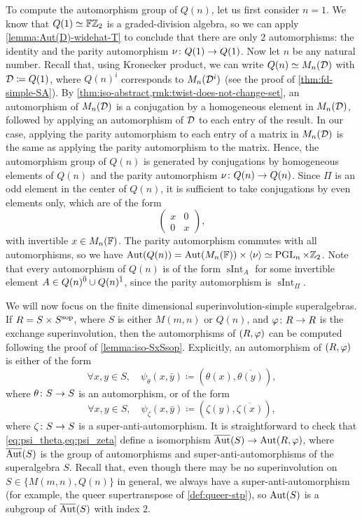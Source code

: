 To compute the automorphism group of $Q(n)$, let us first consider $n = 1$. 
We know that $Q(1) \simeq \mathbb{F}\mathbb{Z}_2$ is a graded-division algebra, so we can apply \cref{lemma:Aut(D)-widehat-T} to conclude that there are only $2$ automorphisms: the identity and the parity automorphism $\nu\colon Q(1) \to Q(1)$. 
Now let $n$ be any natural number. 
Recall that, using Kronecker product, we can write $Q(n) \simeq M_n(\mathcal{D})$ with $\mathcal{D} \coloneqq Q(1)$, where $Q(n)^i$ corresponds to $M_n(\mathcal{D}^i)$ (see the proof of \cref{thm:fd-simple-SA}). 
By \cref{thm:iso-abstract,rmk:twist-does-not-change-set}, an automorphism of $M_n(\mathcal{D})$ is a conjugation by a homogeneous element in $M_n(\mathcal{D})$, followed by applying an automorphism of $\mathcal{D}$ to each entry of the result. 
In our case, applying the parity automorphism to each entry of a matrix in $M_n(\mathcal{D})$ is the same as applying the parity automorphism to the matrix. 
Hence, the automorphism group of $Q(n)$ is generated by conjugations by homogeneous elements of $Q(n)$ and the parity automorphism $\nu\colon Q(n) \to Q(n)$. 
Since $\Pi$ is an odd element in the center of $Q(n)$, it is sufficient to take conjugations by even elements only, which are of the form
\[
\begin{pmatrix}
    x & 0\\
    0 & x
\end{pmatrix},
\]
with invertible $x \in M_{n}(\mathbb{F})$. 
The parity automorphism commutes with all automorphisms, so we have $\operatorname{Aut}(Q(n)) = \operatorname{Aut}(M_n(\mathbb{F})) \times \langle \nu \rangle \simeq \operatorname{PGL}_n \times \mathbb{Z}_2$. 
Note that every automorphism of $Q(n)$ is of the form $\operatorname{sInt}_A$ for some invertible element $A \in Q(n)^{\bar0} \cup Q(n)^{\bar1}$, since the parity automorphism is $\operatorname{sInt}_\Pi$. 

We will now focus on the finite dimensional superinvolution-simple superalgebras. 
If $R = S\times S^{\mathrm{sop}}$, where $S$ is either $M(m,n)$ or $Q(n)$, and $\varphi\colon R \to R$ is the exchange superinvolution, then the automorphisms of $(R, \varphi)$ can be computed following the proof of \cref{lemma:iso-SxSsop}. 
Explicitly, an automorphism of $(R, \varphi)$ is either of the form
\[\label{eq:psi_theta}
    \forall x,y \in S, \quad \psi_\theta (x, \bar {y}) \coloneqq (\theta(x), \overline{\theta(y)}),
\]
where $\theta\colon S \to S$ is an automorphism, or of the form
\[\label{eq:psi_zeta}
    \forall x,y \in S, \quad \psi_\zeta (x, \bar {y}) \coloneqq (\zeta(y), \overline{\zeta(x)}),
\]
where $\zeta\colon S \to S$ is a super-anti-automorphism. 
It is straightforward to check that \cref{eq:psi_theta,eq:psi_zeta} define a isomorphism $\overline{\operatorname{Aut}}(S) \to \operatorname{Aut}(R, \varphi)$, where $\overline{\operatorname{Aut}}(S)$ is the group of automorphisms and super-anti-automorphisms of the superalgebra $S$. 
Recall that, even though there may be no superinvolution on $S \in \{ M(m,n), Q(n) \}$ in general, we always have a super-anti-automorphism (for example, the queer supertranspose of  \cref{def:queer-stp}), so $\operatorname{Aut} (S)$ is a subgroup of $\overline{\operatorname{Aut}}(S)$ with index $2$.


